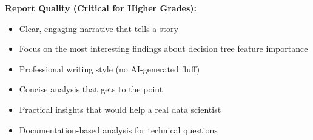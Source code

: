 \documentclass[
  letterpaper,
  DIV=11,
  numbers=noendperiod]{scrartcl}
\providecommand{\tightlist}{%
  \setlength{\itemsep}{0pt}\setlength{\parskip}{0pt}}
\begin{document}
\textbf{Report Quality (Critical for Higher Grades):}

\begin{itemize}
\tightlist
\item[$\square$]
  Clear, engaging narrative that tells a story
\item[$\square$]
  Focus on the most interesting findings about decision tree feature
  importance
\item[$\square$]
  Professional writing style (no AI-generated fluff)
\item[$\square$]
  Concise analysis that gets to the point
\item[$\square$]
  Practical insights that would help a real data scientist
\item[$\square$]
  Documentation-based analysis for technical questions
\end{itemize}
\end{document}

